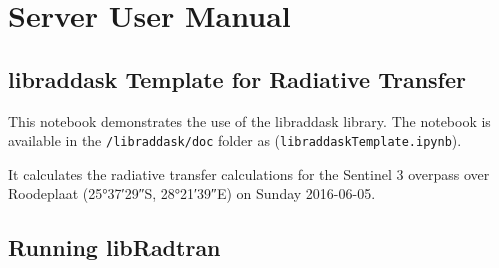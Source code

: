 

\chapter{Server User Manual}
\label{chap:ServerUserManual}

\section{libraddask Template for Radiative Transfer}
\label{sec:libraddaskTemplateforRadiativeTransfer}

This notebook demonstrates the use of the libraddask library.
The notebook  is available in the \lstinline{/libraddask/doc} folder as 
(\lstinline{libraddaskTemplate.ipynb}).

It calculates the radiative transfer calculations for the Sentinel 3 overpass over
Roodeplaat (\ang{25;37;29}S, \ang{28;21;39}E) on Sunday 2016-06-05.



\section{Running libRadtran}
\label{sec:RunninglibRadtran}

